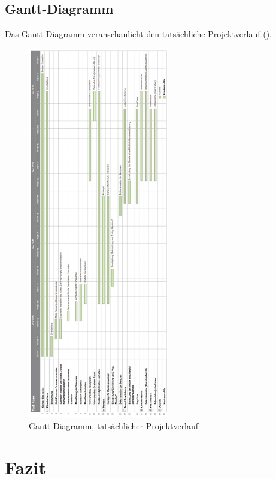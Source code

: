 \documentclass[12pt, oneside, smallheadings]{scrbook}
\begin{document}
\section{Gantt-Diagramm}

Das Gantt-Diagramm veranschaulicht den tatsächliche Projektverlauf ().

\begin{figure}[h!]
	\centering
	\includegraphics[width=0.55\textwidth]{img/Projektverlauf/GanttDiagramm.png}
	\caption{Gantt-Diagramm, tatsächlicher Projektverlauf}
	\label{fig:projektverlaufGanttDiagramm}
\end{figure}



\chapter{Fazit}	
\label{chap:fazit}
\end{document}
